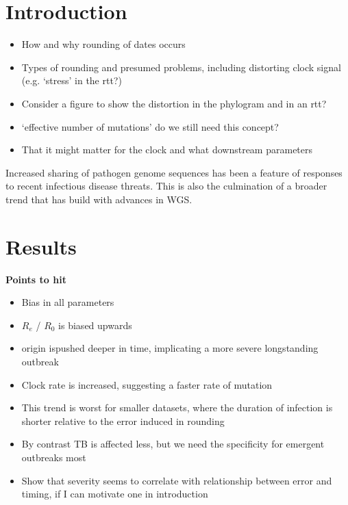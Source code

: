 \documentclass{article}
\begin{document}
\begin{spacing}{1.5}
\section*{Introduction}
\begin{itemize}
    \item How and why rounding of dates occurs
    \item Types of rounding and presumed problems, including distorting clock signal (e.g. `stress' in the rtt?)
    \item Consider a figure to show the distortion in the phylogram and in an rtt?
    \item `effective number of mutations' do we still need this concept?
    \item That it might matter for the clock and what downstream parameters
\end{itemize}

Increased sharing of pathogen genome sequences has been a feature of responses to recent infectious disease threats. This is also the culmination of a broader trend that has build with advances in WGS. 

\section*{Results}
\textbf{Points to hit}
\begin{itemize}
    \item Bias in all parameters
    \item $R_e$ / $R_0$ is biased upwards
    \item origin ispushed deeper in time, implicating a more severe longstanding outbreak
    \item Clock rate is increased, suggesting a faster rate of mutation
    \item This trend is worst for smaller datasets, where the duration of infection is shorter relative to the error induced in rounding
    \item By contrast TB is affected less, but we need the specificity for emergent outbreaks most
    \item Show that severity seems to correlate with relationship between error and timing, if I can motivate one in introduction
\end{itemize}


\end{spacing}
\end{document}
